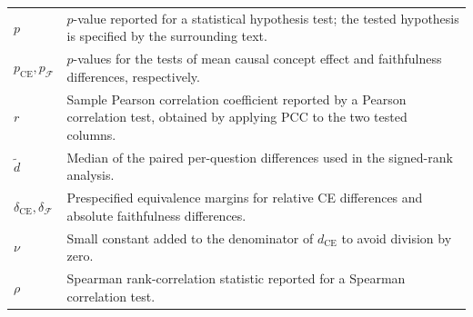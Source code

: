 \begin{longtable}{@{}>{\raggedright\arraybackslash}p{} p{}@{}}
	$p$                                                & $p$-value reported for a statistical hypothesis test; the tested hypothesis is specified by the surrounding text.                                                                                     \\
	$p_{\mathrm{CE}},p_{\mathcal{F}}$                  & $p$-values for the tests of mean causal concept effect and faithfulness differences, respectively.                                                                                                    \\
	$r$                                                & Sample Pearson correlation coefficient reported by a Pearson correlation test, obtained by applying $\mathrm{PCC}$ to the two tested columns.                                                         \\
	$\widetilde{d}$                                    & Median of the paired per-question differences used in the signed-rank analysis.                                                                                                                       \\
	$\delta_{\mathrm{CE}},\delta_{\mathcal{F}}$        & Prespecified equivalence margins for relative CE differences and absolute faithfulness differences.                                                                                                   \\
	$\nu$                                              & Small constant added to the denominator of $d_{\mathrm{CE}}$ to avoid division by zero.                                                                                                               \\
	$\rho$                                             & Spearman rank-correlation statistic reported for a Spearman correlation test.                                                                                                                         \\
\end{longtable}
